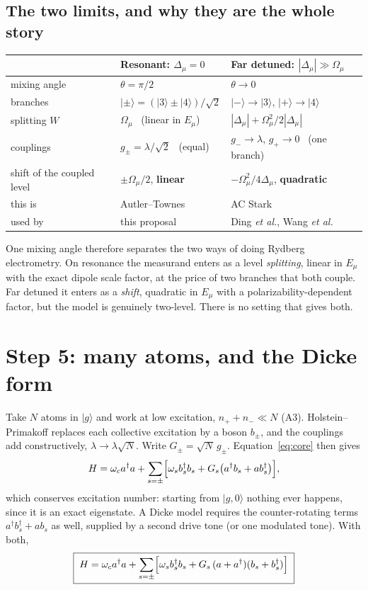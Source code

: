 \documentclass[11pt,a4paper]{article}
\newcommand{\ket}[1]{\lvert #1 \rangle}
\newcommand{\dg}{^{\dagger}}
\newcommand{\Omu}{\Omega_{\mu}}
\newcommand{\Dmu}{\Delta_{\mu}}
\begin{document}
\subsection*{The two limits, and why they are the whole story}

\begin{center}\small
\begin{tabular}{@{}>{\raggedright\arraybackslash}p{3.5cm}>{\raggedright\arraybackslash}p{5.0cm}>{\raggedright\arraybackslash}p{5.6cm}@{}}
\toprule
& \textbf{Resonant:} $\Dmu=0$ & \textbf{Far detuned:} $|\Dmu|\gg\Omu$\\
\midrule
mixing angle & $\theta=\pi/2$ & $\theta\to0$\\
branches & $\ket{\pm}=(\ket{3}\pm\ket{4})/\sqrt2$ & $\ket{-}\to\ket{3}$, $\ket{+}\to\ket{4}$\\
splitting $W$ & $\Omu$ \ (linear in $E_\mu$) & $|\Dmu|+\Omu^2/2|\Dmu|$\\
couplings & $g_\pm=\lambda/\sqrt2$ \ (equal) & $g_-\to\lambda$, $g_+\to0$ \ (one branch)\\
shift of the coupled level & $\pm\Omu/2$, \textbf{linear} & $-\Omu^2/4\Dmu$, \textbf{quadratic}\\
this is & Autler--Townes & AC Stark\\
used by & this proposal & Ding \emph{et al.}, Wang \emph{et al.}\\
\bottomrule
\end{tabular}
\end{center}

\noindent One mixing angle therefore separates the two ways of doing Rydberg electrometry. On
resonance the measurand enters as a level \emph{splitting}, linear in $E_\mu$ with the exact
dipole scale factor, at the price of two branches that both couple. Far detuned it enters as a
\emph{shift}, quadratic in $E_\mu$ with a polarizability-dependent factor, but the model is
genuinely two-level. There is no setting that gives both.

\section{Step 5: many atoms, and the Dicke form}

Take $N$ atoms in $\ket{g}$ and work at low excitation, $n_++n_-\ll N$ (A3). Holstein--Primakoff
replaces each collective excitation by a boson $b_\pm$, and the couplings add constructively,
$\lambda\to\lambda\sqrt N$. Write $G_\pm = \sqrt N\,g_\pm$. Equation~\eqref{eq:core} then gives
\begin{equation}
  H=\omega_c a\dg a+\sum_{s=\pm}\Bigl[\omega_s b_s\dg b_s + G_s\bigl(a\dg b_s+a b_s\dg\bigr)\Bigr],
\end{equation}
which conserves excitation number: starting from $\ket{g,0}$ nothing ever happens, since it is
an exact eigenstate. A Dicke model requires the counter-rotating terms $a\dg b_s\dg + ab_s$ as
well, supplied by a second drive tone (or one modulated tone). With both,
\begin{equation}
  \boxed{\;H=\omega_c a\dg a+\sum_{s=\pm}\Bigl[\omega_s b_s\dg b_s
      + G_s\,(a+a\dg)(b_s+b_s\dg)\Bigr]\;}
  \label{eq:dicke}
\end{equation}
\end{document}
